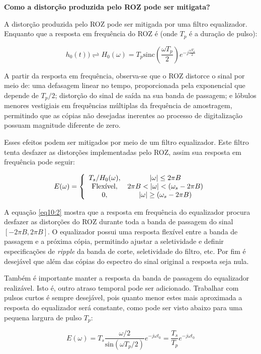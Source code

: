 \textbf{Como a distorção produzida pelo ROZ pode ser mitigata?}
 
 A distorção produzida pelo ROZ pode ser mitigada por uma filtro equalizador. Enquanto que a resposta em frequência do ROZ é (onde $T_p$ é a duração de pulso):
 
 \begin{equation} \label{eq10:1}
     h_0(t) ) \rightleftharpoons H_0(\omega) = T_p \text{sinc}\left(\frac{\omega T_p}{2}\right) e^{-j\frac{\omega T_p}{2}}
 \end{equation}
 
 A partir da resposta em frequência, observa-se que o ROZ distorce o sinal por meio de: uma defasagem linear no tempo, proporcionada pela exponencial que depende de $T_p/2$; distorção do sinal de saída na sua banda de passagem; e lóbulos menores vestigiais em frequências múltiplas da frequência de amostragem, permitindo que as cópias não desejadas inerentes ao processo de digitalização possuam magnitude diferente de zero.
 
Esses efeitos podem ser mitigados por meio de um filtro equalizador. Este filtro tenta desfazer as distorções implementadas pelo ROZ, assim sua resposta em frequência pode seguir:

\begin{equation} \label{eq10:2}
\centering
E(\omega) =
\left \{
\begin{array}{cc}
T_s/H_0(\omega), & |\omega| \leq 2\pi B \\
\text{Flexível}, & 2\pi B < |\omega| < (\omega_s - 2\pi B) \\
0, & |\omega| \geq (\omega_s - 2\pi B)
\end{array}
\right.
\end{equation}

A equação \ref{eq10:2} mostra que a resposta em frequência do equalizador procura desfazer as distorções do ROZ durante toda a banda de passagem do sinal $[-2\pi B, 2\pi B]$. O equalizador possui uma resposta flexível entre a banda de passagem e a próxima cópia, permitindo ajustar a seletividade e definir especificações de \textit{ripple} da banda de corte, seletividade do filtro, etc. Por fim é desejável que além das cópias do espectro do sinal original a resposta seja nula. 

Também é importante manter a resposta da banda de passagem do equalizador realizável. Isto é, outro atraso temporal pode ser adicionado. Trabalhar com pulsos curtos é sempre desejável, pois quanto menor estes mais aproximada a resposta do equalizador será constante, como pode ser visto abaixo para uma pequena largura de pulso $T_p$:

\begin{equation}
    E(\omega) = T_s \frac{\omega/2}{\text{sin}(\omega T_p/2)} e^{-j\omega t_0} = \frac{T_s}{T_p} e^{-j\omega t_0}
\end{equation}
